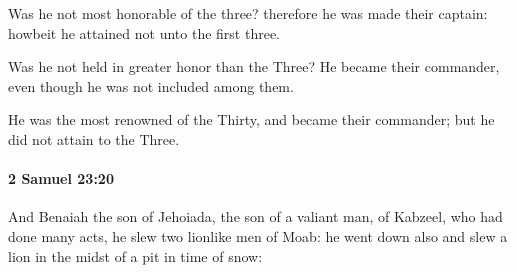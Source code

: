 			\begin{versebox}
					\item[BHS] 
					\item[ASV] Was he not most honorable of the three? therefore he was made their captain: howbeit he attained not unto the first three.
					\item[NIV] Was he not held in greater honor than the Three? He became their commander, even though he was not included among them.
					\item[NRSV] He was the most renowned of the Thirty, and became their commander; but he did not attain to the Three.
			\end{versebox}

		\paragraph{2 Samuel 23:20} %
			\label{2SAMUEL-23-20}

			And Benaiah the son of Jehoiada, the son of a valiant man, of Kabzeel, who had done many acts, he slew two lionlike men of Moab: he went down also and slew a lion in the midst of a pit in time of snow:

